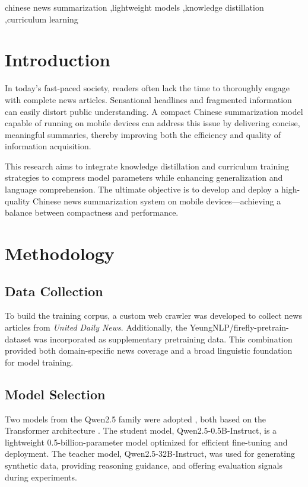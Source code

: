 \documentclass[preprint,12pt]{elsarticle}
\begin{document}
\begin{frontmatter}
\begin{keyword}
chinese news summarization \sep lightweight models \sep knowledge distillation \sep curriculum learning
\end{keyword}

\end{frontmatter}

\section{Introduction}

In today’s fast-paced society, readers often lack the time to thoroughly engage with complete news articles. Sensational headlines and fragmented information can easily distort public understanding. A compact Chinese summarization model capable of running on mobile devices can address this issue by delivering concise, meaningful summaries, thereby improving both the efficiency and quality of information acquisition.

This research aims to integrate knowledge distillation and curriculum training strategies to compress model parameters while enhancing generalization and language comprehension. The ultimate objective is to develop and deploy a high-quality Chinese news summarization system on mobile devices—achieving a balance between compactness and performance.


\section{Methodology}

\subsection{Data Collection}
To build the training corpus, a custom web crawler was developed to collect news articles from \textit{United Daily News}. Additionally, the YeungNLP/firefly-pretrain-dataset was incorporated as supplementary pretraining data. This combination provided both domain-specific news coverage and a broad linguistic foundation for model training.

\subsection{Model Selection}
Two models from the Qwen2.5 family were adopted \cite{qwen2.5}, both based on the Transformer architecture \cite{vaswani2017}. The student model, Qwen2.5-0.5B-Instruct, is a lightweight 0.5-billion-parameter model optimized for efficient fine-tuning and deployment. The teacher model, Qwen2.5-32B-Instruct, was used for generating synthetic data, providing reasoning guidance, and offering evaluation signals during experiments.
\end{document}
